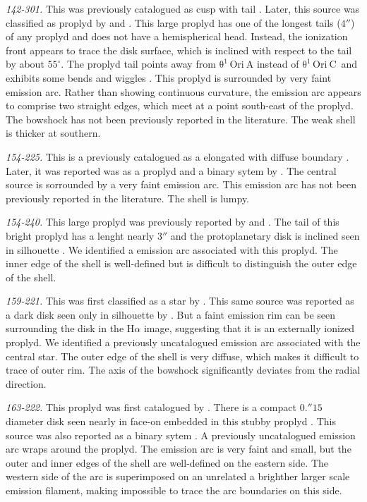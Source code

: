 \documentclass{article}
\newcommand\ha{\ensuremath{\mathrm{H}\alpha}}
\newcommand\thC{\ensuremath{\mathrm{\theta^1\,Ori~C}}}
\begin{document}
\textit{142-301.} This was previously catalogued as cusp with tail  \citep{Odell:1996}. Later, this source was classified as proplyd by \citet{Bally:2000a} and \citet{Ricci:2008}. This large proplyd has one of the longest tails (\(4''\)) of any proplyd and does not have a hemispherical head. Instead, the ionization front appears to trace the disk surface, which is inclined with respect to the tail by about $55^{\circ}$. The proplyd tail points away from \(\mathrm{\theta^1\,Ori~A}\) instead of \thC~and exhibits some bends and wiggles \citep{Bally:2000a}. This proplyd is surrounded by very faint emission arc. Rather than showing continuous curvature, the emission arc appears to comprise two straight edges, which meet at a point south-east of the proplyd. The bowshock has not been previously reported in the literature. The weak shell is thicker at southern. 

\textit{154-225.} This is a previously catalogued as a elongated with diffuse boundary \citep{Odell:1996}. Later, it was reported was as a proplyd and a binary sytem by \citet{Ricci:2008}. The central source is sorrounded by a very faint emission arc.  This  emission arc has not been previously reported in the literature. The shell is lumpy.

\textit{154-240.} This large proplyd was previously reported by \citet{Bally:2000a} and \citet{Ricci:2008}. The tail of this bright proplyd has a lenght nearly \(3''\) and the protoplanetary disk is inclined seen in silhouette \citep{Bally:2000a}. We identified a emission arc associated with this proplyd. The inner edge of the shell is well-defined but is difficult to distinguish the outer edge of the shell.  

\textit{159-221.} This was first classified as a star by \citet{Odell:1996}. This same source was reported as a dark disk seen only in silhouette by \citet{Ricci:2008}.  But a faint emission rim can be seen surrounding the disk in the \ha{} image, suggesting that it is an externally ionized proplyd. We identified a previously uncatalogued emission arc associated with the central star. The outer edge of the shell is very diffuse, which  makes it difficult to trace of outer rim. The axis of the bowshock significantly deviates from the radial direction.

\textit{163-222.} This proplyd was first catalogued by \citet{Odell:1996}. There is a compact \(0.''15\) diameter disk seen nearly in face-on embedded  in this stubby  proplyd \citep{Bally:2000a, Ricci:2008}.  This source was also reported as a binary sytem \citep{Ricci:2008}. A previously uncatalogued emission arc wraps around the proplyd. The emission arc is very faint and small, but the outer and inner edges of the shell are well-defined on the eastern side. The western side of the arc is superimposed on an unrelated a brighther larger scale emission filament, making impossible to trace the arc boundaries on this side. 
\end{document}
